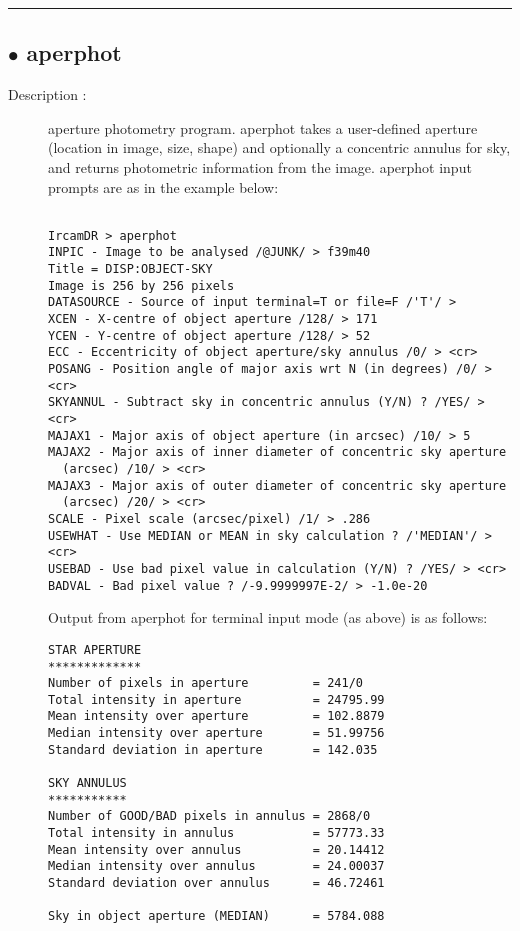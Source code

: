 \hrule \subsection*{$\bullet$ aperphot}
\begin{description}
\item[Description :] aperture photometry program.  aperphot takes a user-defined
aperture (location in image, size, shape) and optionally a concentric
annulus for sky, and returns photometric information from the image.  
aperphot input prompts are as in the example below:
\begin{verbatim}
 
IrcamDR > aperphot
INPIC - Image to be analysed /@JUNK/ > f39m40
Title = DISP:OBJECT-SKY
Image is 256 by 256 pixels
DATASOURCE - Source of input terminal=T or file=F /'T'/ > 
XCEN - X-centre of object aperture /128/ > 171
YCEN - Y-centre of object aperture /128/ > 52
ECC - Eccentricity of object aperture/sky annulus /0/ > <cr>
POSANG - Position angle of major axis wrt N (in degrees) /0/ > <cr>
SKYANNUL - Subtract sky in concentric annulus (Y/N) ? /YES/ > <cr>
MAJAX1 - Major axis of object aperture (in arcsec) /10/ > 5
MAJAX2 - Major axis of inner diameter of concentric sky aperture 
  (arcsec) /10/ > <cr>
MAJAX3 - Major axis of outer diameter of concentric sky aperture 
  (arcsec) /20/ > <cr>
SCALE - Pixel scale (arcsec/pixel) /1/ > .286
USEWHAT - Use MEDIAN or MEAN in sky calculation ? /'MEDIAN'/ > <cr>
USEBAD - Use bad pixel value in calculation (Y/N) ? /YES/ > <cr>
BADVAL - Bad pixel value ? /-9.9999997E-2/ > -1.0e-20

\end{verbatim}

Output from aperphot for terminal input mode (as above) is as follows:

\begin{verbatim}
STAR APERTURE
*************
Number of pixels in aperture         = 241/0
Total intensity in aperture          = 24795.99
Mean intensity over aperture         = 102.8879
Median intensity over aperture       = 51.99756
Standard deviation in aperture       = 142.035
 
SKY ANNULUS
***********
Number of GOOD/BAD pixels in annulus = 2868/0
Total intensity in annulus           = 57773.33
Mean intensity over annulus          = 20.14412
Median intensity over annulus        = 24.00037
Standard deviation over annulus      = 46.72461
 
Sky in object aperture (MEDIAN)      = 5784.088
 

\end{verbatim}
\end{description}
